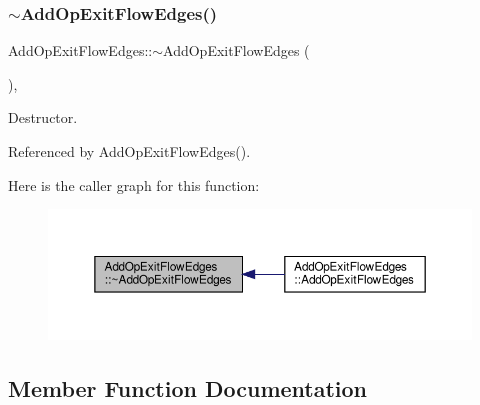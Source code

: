 \subsubsection{\texorpdfstring{$\sim$\+Add\+Op\+Exit\+Flow\+Edges()}{~AddOpExitFlowEdges()}}
{\footnotesize\ttfamily Add\+Op\+Exit\+Flow\+Edges\+::$\sim$\+Add\+Op\+Exit\+Flow\+Edges (\begin{DoxyParamCaption}{ }\end{DoxyParamCaption})\hspace{0.3cm}{\ttfamily [override]}, {\ttfamily [default]}}



Destructor. 



Referenced by Add\+Op\+Exit\+Flow\+Edges().

Here is the caller graph for this function\+:
\nopagebreak
\begin{figure}[H]
\begin{center}
\leavevmode
\includegraphics[width=350pt]{dd/d49/classAddOpExitFlowEdges_aa8222b8eb47330a6616fc07f329b8073_icgraph}
\end{center}
\end{figure}


\subsection{Member Function Documentation}
\mbox{\label{classAddOpExitFlowEdges_aefe934ca0a4f3717e458d9d1e3ddf5ed}} 
